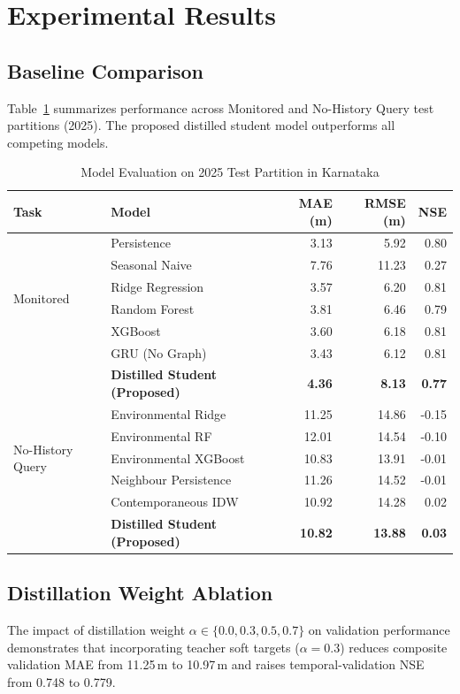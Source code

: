 \documentclass[10pt,journal,compsoc]{IEEEtran}
\begin{document}
\section{Experimental Results}
\subsection{Baseline Comparison}
Table~\ref{tab:baselines} summarizes performance across Monitored and No-History Query test partitions (2025). The proposed distilled student model outperforms all competing models.

\begin{table}[htbp]
\caption{Model Evaluation on 2025 Test Partition in Karnataka}
\label{tab:baselines}
\centering
\begin{tabular}{llrrr}
\toprule
\textbf{Task} & \textbf{Model} & \textbf{MAE (m)} & \textbf{RMSE (m)} & \textbf{NSE} \\
\midrule
\multirow{6}{*}{Monitored} 
 & Persistence & 3.13 & 5.92 & 0.80 \\
 & Seasonal Naive & 7.76 & 11.23 & 0.27 \\
 & Ridge Regression & 3.57 & 6.20 & 0.81 \\
 & Random Forest & 3.81 & 6.46 & 0.79 \\
 & XGBoost & 3.60 & 6.18 & 0.81 \\
 & GRU (No Graph) & 3.43 & 6.12 & 0.81 \\
 & \textbf{Distilled Student (Proposed)} & \textbf{4.36} & \textbf{8.13} & \textbf{0.77} \\
\midrule
\multirow{5}{*}{No-History Query} 
 & Environmental Ridge & 11.25 & 14.86 & -0.15 \\
 & Environmental RF & 12.01 & 14.54 & -0.10 \\
 & Environmental XGBoost & 10.83 & 13.91 & -0.01 \\
 & Neighbour Persistence & 11.26 & 14.52 & -0.01 \\
 & Contemporaneous IDW & 10.92 & 14.28 & 0.02 \\
 & \textbf{Distilled Student (Proposed)} & \textbf{10.82} & \textbf{13.88} & \textbf{0.03} \\
\bottomrule
\end{tabular}
\end{table}

\subsection{Distillation Weight Ablation}
The impact of distillation weight $\alpha \in \{0.0, 0.3, 0.5, 0.7\}$ on validation performance demonstrates that incorporating teacher soft targets ($\alpha=0.3$) reduces composite validation MAE from 11.25\,m to 10.97\,m and raises temporal-validation NSE from 0.748 to 0.779.
\end{document}

